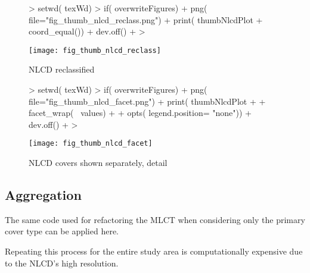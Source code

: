 \begin{figure} 
\begin{center}

\begin{Schunk}
\begin{Sinput}
> setwd( texWd)
> if( overwriteFigures) {
+   png( file="fig_thumb_nlcd_reclass.png")
+   print( thumbNlcdPlot + coord_equal())
+   dev.off()
+ }
> 
\end{Sinput}
\end{Schunk}

\texttt{[image: fig\_thumb\_nlcd\_reclass]}
\end{center} 
\caption{NLCD reclassified} 
\label{fig:thumb_nlcd_reclass} 
\end{figure} 

\begin{figure} 
\begin{center}
  
\begin{Schunk}
\begin{Sinput}
> setwd( texWd)
> if( overwriteFigures) {
+   png( file="fig_thumb_nlcd_facet.png")
+   print( thumbNlcdPlot + 
+         facet_wrap(~ values) + 
+         opts( legend.position= "none"))
+   dev.off()
+ }
> 
\end{Sinput}
\end{Schunk}

\texttt{[image: fig\_thumb\_nlcd\_facet]}
\end{center} 
\caption{NLCD covers shown separately, detail} 
\label{fig:thumb_nlcd_facet} 
\end{figure} 

\subsection{Aggregation}
\label{sec:nlcd-aggr}

The same code used for refactoring the MLCT when considering only the
primary cover type can be applied here.

Repeating this process for the entire study area is computationally
expensive due to the NLCD's high resolution.


\begin{Schunk}
\end{Schunk}

